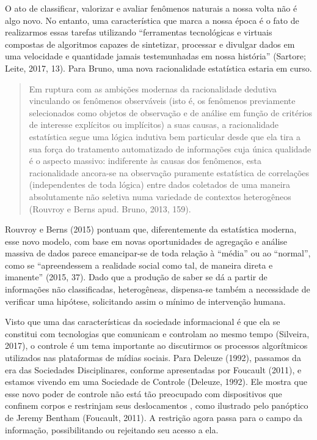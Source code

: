 O ato de classificar, valorizar e avaliar fenômenos naturais a nossa
volta não é algo novo. No entanto, uma característica que marca a nossa
época é o fato de realizarmos essas tarefas utilizando ``ferramentas
tecnológicas e virtuais compostas de algoritmos capazes de sintetizar,
processar e divulgar dados em uma velocidade e quantidade jamais
testemunhadas em nossa história'' (Sartore; Leite, 2017, 13). Para Bruno, uma nova racionalidade estatística estaria em
curso.

\begin{quote}
Em ruptura com as ambições modernas da racionalidade dedutiva vinculando
os fenômenos observáveis (isto é, os fenômenos previamente selecionados
como objetos de observação e de análise em função de critérios de
interesse explícitos ou implícitos) a suas causas, a racionalidade
estatística segue uma lógica indutiva bem particular desde que ela tira
a sua força do tratamento automatizado de informações cuja única
qualidade é o aspecto massivo: indiferente às causas dos fenômenos, esta
racionalidade ancora-se na observação puramente estatística de
correlações (independentes de toda lógica) entre dados coletados de uma
maneira absolutamente não seletiva numa variedade de contextos
heterogêneos (Rouvroy e Berns apud. Bruno, 2013, 159).
\end{quote}

Rouvroy e Berns (2015) pontuam que, diferentemente da estatística
moderna, esse novo modelo, com base em novas oportunidades de agregação
e análise massiva de dados parece emancipar-se de toda relação à
``média'' ou ao ``normal'', como se ``apreendessem a realidade social
como tal, de maneira direta e imanente'' (2015, 37). Dado que a produção
de saber se dá a partir de informações não classificadas, heterogêneas,
dispensa-se também a necessidade de verificar uma hipótese, solicitando
assim o mínimo de intervenção humana.

Visto que uma das características da sociedade informacional é que ela
se constitui com tecnologias que comunicam e controlam ao mesmo tempo
(Silveira, 2017), o controle é um tema importante ao discutirmos os
processos algorítmicos utilizados nas plataformas de mídias sociais.
Para Deleuze (1992), passamos da era das Sociedades Disciplinares,
conforme apresentadas por Foucault (2011),
e estamos vivendo em uma Sociedade de Controle (Deleuze, 1992). Ele mostra que esse novo poder de controle não está tão
preocupado com dispositivos que confinem corpos e restrinjam seus
deslocamentos , como ilustrado pelo panóptico de Jeremy Bentham (Foucault, 2011).
A restrição agora passa para o campo da informação, possibilitando ou rejeitando seu acesso a ela.

